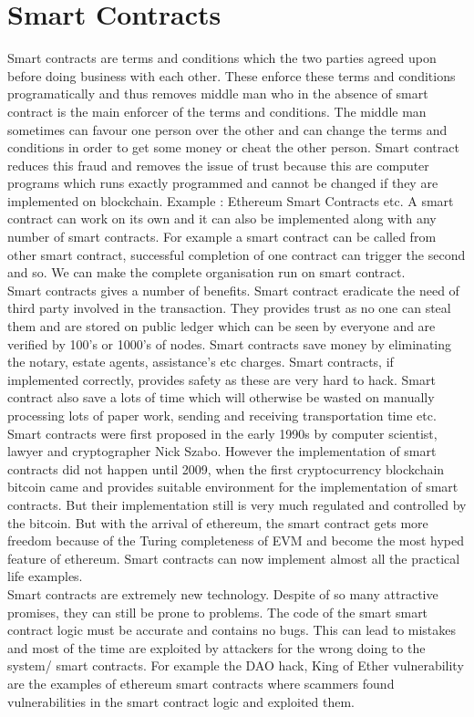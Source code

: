 \section{Smart Contracts}
Smart contracts are terms and conditions which the two parties agreed upon before doing business with each other\cite{ctbegin}. These enforce these terms and conditions programatically and thus removes middle man who in the absence of smart contract is the main enforcer of the terms and conditions. The middle man sometimes can favour one person over the other and can change the terms and conditions in order to get some money or cheat the other person. Smart contract reduces this fraud and removes the issue of trust because this are computer programs which runs exactly programmed and cannot be changed if they are implemented on blockchain. Example : Ethereum Smart Contracts etc. A smart contract can work on its own and it can also be implemented along with any number of smart contracts. For example a smart contract can be called from other smart contract, successful completion of one contract can trigger the second and so. We can make the complete organisation run on smart contract. \\
Smart contracts gives a number of benefits. Smart contract eradicate the need of third party involved in the transaction. They provides trust as no one can steal them and are stored on public ledger which can be seen by everyone and are verified by 100's or 1000's of nodes. Smart contracts save money by eliminating the notary, estate agents, assistance's etc charges. Smart contracts, if implemented correctly, provides safety as these are very hard to hack. Smart contract also save a lots of time which will otherwise be wasted on manually processing lots of paper work,  sending and receiving transportation time etc.\\
Smart contracts were first proposed in the early 1990s by computer scientist, lawyer and cryptographer Nick Szabo. However the implementation of smart contracts did not happen until 2009, when the first cryptocurrency blockchain bitcoin came and provides suitable environment for the implementation of smart contracts. But their implementation still is very much regulated and controlled by the bitcoin. But with the arrival of ethereum, the smart contract gets more freedom because of the Turing completeness of EVM and become the most hyped feature of ethereum. Smart contracts can now implement almost all the practical life examples.\\
Smart contracts are extremely new technology. Despite of so many attractive promises, they can still be prone to problems. The code of the smart smart contract logic must be accurate and contains no bugs. This can lead to mistakes and most of the time are exploited by attackers for the wrong doing to the system/ smart contracts. For example the DAO hack, King of Ether vulnerability are the examples of ethereum smart contracts where scammers found vulnerabilities in the smart contract logic and exploited them.
